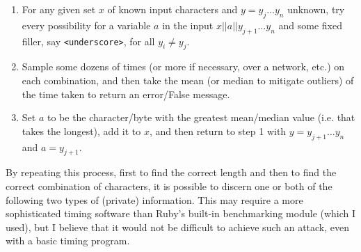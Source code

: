 \documentclass{article}
\providecommand{\tightlist}{
    \setlength{\itemsep}{0pt}\setlength{\parskip}{0pt}
}
\providecommand{\inlinecode}{\texttt}
\begin{document}
\begin{enumerate}\tightlist
  \item For any given set $x$ of known input characters and $y = {y_j \dots y_n}$ unknown, try every possibility for a variable $a$ in the input $x || a || y_{j+1} \dots y_n$ and some fixed filler, say \inlinecode{<underscore>}, for all $y_i \neq y_j$.
  \item Sample some dozens of times (or more if necessary, over a network, etc.) on each combination, and then take the mean (or median to mitigate outliers) of the time taken to return an error/False message.
  \item Set $a$ to be the character/byte with the greatest mean/median value (i.e. that takes the longest), add it to $x$, and then return to step 1 with $y = {y_{j+1} \dots y_n}$ and $a = y_{j+1}$.
\end{enumerate}
By repeating this process, first to find the correct length and then to find the correct combination of characters, it is possible to discern one or both of the following two types of (private) information.
This may require a more sophisticated timing software than Ruby's built-in benchmarking module (which I used), but I believe that it would not be difficult to achieve such an attack, even with a basic timing program.
\end{document}
